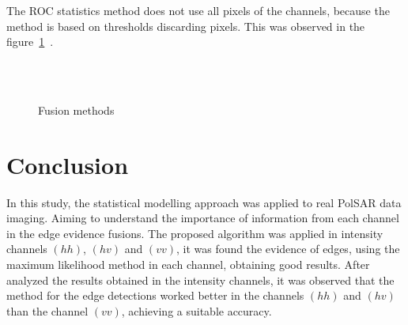 \documentclass[conference]{IEEEtran}
\begin{document}
The ROC statistics method does not use all pixels of the channels, because the method is based on thresholds discarding pixels. This was observed in the figure~\ref{fig_03}~.

\begin{figure}[!ht]
     \hfill
     \\
     \hfill
     \\
     \caption{Fusion methods}
     \label{fig_03}
   \end{figure}

\section{Conclusion}\label{sec_08}
In this study, the statistical modelling approach was applied to real PolSAR data imaging. Aiming to understand the importance of information from each channel in the edge evidence fusions. The proposed algorithm was applied in intensity channels $(hh)$, $(hv)$ and $(vv)$, it was found the evidence of edges, using the maximum likelihood  method in each channel, obtaining good results. After analyzed the results obtained in the intensity channels, it was observed that the method for the edge detections worked better in the channels $(hh)$ and $(hv)$ than the channel $(vv)$, achieving a suitable accuracy.
\end{document}
